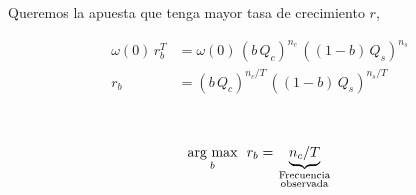 \documentclass[a4paper,10pt]{article}
\newif\ifen
\newif\ifes
\newcommand{\en}[1]{\ifen#1 \fi}
\newcommand{\es}[1]{\ifes#1 \fi}
\begin{document}
\noindent
\en{we find that the relative value of one bet with respect to the other is independent of the payouts $Q_c$ and $Q_s$ offered by the bookmaker.}%
\es{encontramos que el valor relativo de una apuesta respecto de la otra es independiente de los pagos $Q_c$ y $Q_s$ que ofrece la casa de apuestas.}%
%
\en{We can decide the bet without knowing the payouts!}%
\es{Podemos decidir la apuesta sin conocer los pagos!}%
%
Queremos la apuesta que tenga mayor tasa de crecimiento $r$,
\vspace{-0.4cm}
\begin{figure}[ht!]
 \centering
 \begin{subfigure}[b]{0.54\textwidth}
  \begin{equation*}
\begin{split}
  \omega(0) \, r_b^T &= \omega(0) \, (b \,  Q_c)^{n_c}  \,  ((1-b) \, Q_s)^{n_s}   \\
  r_b &=(b \,  Q_c)^{n_c/T}  \,  ((1-b) \, Q_s)^{n_s/T}
\end{split}
\end{equation*}
 \end{subfigure}
 \
 \begin{subfigure}[b]{0.29\textwidth}
  \begin{equation*}
\begin{split}
\underset{b}{\text{arg max}} \ \  r_b = \underbrace{n_c/T}_{\hfrac{\text{\scriptsize Frecuencia}}{\text{\scriptsize observada}}}
\end{split}
\end{equation*}
 \end{subfigure}
\end{figure}
\vspace{-0.1cm}

\end{document}

